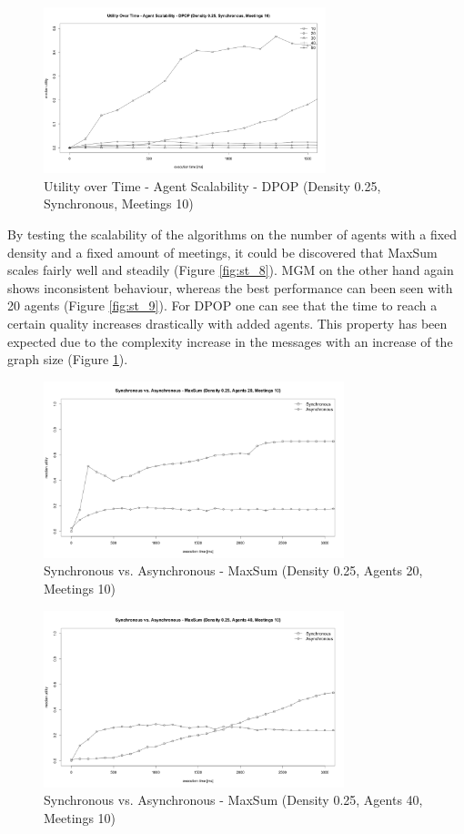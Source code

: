 \begin{figure}[H]
\centering
\includegraphics[width=310px]{graphics/experiments/static/st_10}
\caption{Utility over Time - Agent Scalability - DPOP (Density 0.25, Synchronous, Meetings 10)}
\label{fig:st_10}
\end{figure}
By testing the scalability of the algorithms on the number of agents with a fixed density and a fixed amount of meetings, it could be discovered that MaxSum scales fairly well and steadily (Figure \ref{fig:st_8}). MGM on the other hand again shows inconsistent behaviour, whereas the best performance can been seen with 20 agents (Figure \ref{fig:st_9}). For DPOP one can see that the time  to reach a certain quality increases drastically with added agents. This property has been expected due to the complexity increase in the messages with an increase of the graph size (Figure \ref{fig:st_10}).
\begin{figure}[H]
\centering
\includegraphics[width=330px]{graphics/experiments/static/st_11}
\caption{Synchronous vs. Asynchronous - MaxSum (Density 0.25, Agents 20, Meetings 10)}
\label{fig:st_11}
\end{figure}
\begin{figure}[H]
\centering
\includegraphics[width=330px]{graphics/experiments/static/st_12}
\caption{Synchronous vs. Asynchronous - MaxSum (Density 0.25, Agents 40, Meetings 10)}
\label{fig:st_12}
\end{figure}
